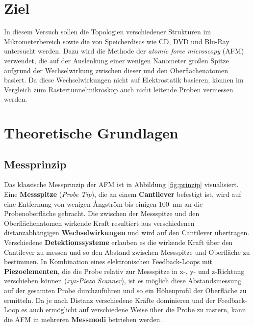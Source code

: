 \section{Ziel}
    In diesem Versuch sollen die Topologien verschiedener Strukturen im Mikrometerbereich sowie die von Speicherdiscs wie CD, DVD und Blu-Ray untersucht werden. Dazu wird die Methode der \textit{atomic force
    microscopy} (AFM) verwendet, die auf der Auslenkung einer wenigen Nanometer großen Spitze aufgrund der Wechselwirkung zwischen dieser und den Oberflächenatomen basiert. Da diese Wechselwirkungen nicht
    auf Elektrostatik basieren, können im Vergleich zum Rastertunnelmikroskop auch nicht leitende Proben vermessen werden.    
    
\section{Theoretische Grundlagen}
    \subsection{Messprinzip}
        Das klassische Messprinzip der AFM ist in Abbildung \ref{fig:prinzip} visualisiert. Eine \textbf{Messspitze} (\textit{Probe Tip}), die an einem \textbf{Cantilever} befestigt ist, wird auf eine 
        Entfernung von wenigen \AA ngström bis einigen \SI{100}{\nano\metre} an die Probenoberfläche gebracht. Die zwischen der Messspitze und den Oberflächenatomen wirkende Kraft resultiert aus verschiedenen
        distanzabhängigen \textbf{Wechselwirkungen} und wird auf den Cantilever übertragen. Verschiedene \textbf{Detektionssysteme} erlauben es die wirkende Kraft über den Cantilever zu messen und so den 
        Abstand zwischen Messspitze und Oberfläche zu bestimmen. In Kombination eines elektronischen Feedback-Loops mit \textbf{Piezoelementen}, die die Probe relativ zur Messspitze in x-, y- und z-Richtung
        verschieben können (\textit{xyz-Piezo Scanner}), ist es möglich diese Abstandsmessung auf der gesamten Probe durchzuführen und so ein Höhenprofil der Oberfläche zu ermitteln. Da je nach Distanz verschiedene Kräfte dominieren und
        der Feedback-Loop es auch ermöglicht auf verschiedene Weise über die Probe zu rastern, kann die AFM in mehreren \textbf{Messmodi} betrieben werden.

        \FloatBarrier

